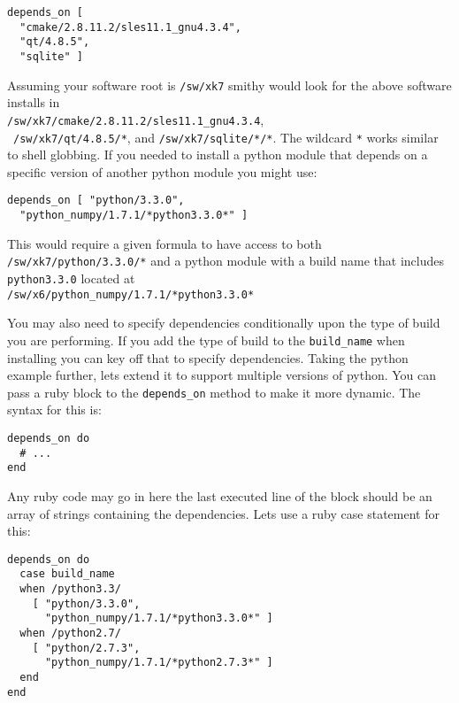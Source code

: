 \documentclass{acm_proc_article-sp}
\begin{document}
\begin{quoting}
\begin{verbatim}
depends_on [
  "cmake/2.8.11.2/sles11.1_gnu4.3.4",
  "qt/4.8.5",
  "sqlite" ]
\end{verbatim}
\end{quoting}

Assuming your software root is \texttt{/sw/xk7} smithy would look for the above
software installs in \\
\texttt{/sw/xk7/cmake/2.8.11.2/sles11.1\_gnu4.3.4}, \\
~\texttt{/sw/xk7/qt/4.8.5/*}, and \texttt{/sw/xk7/sqlite/*/*}. The wildcard
\texttt{*} works similar to shell globbing. If you needed to install a python
module that depends on a specific version of another python module you might
use:

\begin{quoting}
\begin{verbatim}
depends_on [ "python/3.3.0",
  "python_numpy/1.7.1/*python3.3.0*" ]
\end{verbatim}
\end{quoting}

This would require a given formula to have access to both
\texttt{/sw/xk7/python/3.3.0/*} and a python module with a build name that includes
\texttt{python3.3.0} located at \\
\texttt{/sw/x6/python\_numpy/1.7.1/*python3.3.0*}

You may also need to specify dependencies conditionally upon the type of build
you are performing. If you add the type of build to the \texttt{build\_name}
when installing you can key off that to specify dependencies. Taking the python
example further, lets extend it to support multiple versions of python. You can
pass a ruby block to the \texttt{depends\_on} method to make it more dynamic.
The syntax for this is:

\begin{quoting}
\begin{verbatim}
depends_on do
  # ...
end
\end{verbatim}
\end{quoting}

Any ruby code may go in here the last executed line of the block should be an
array of strings containing the dependencies. Lets use a ruby case statement
for this:

\begin{quoting}
\begin{verbatim}
depends_on do
  case build_name
  when /python3.3/
    [ "python/3.3.0",
      "python_numpy/1.7.1/*python3.3.0*" ]
  when /python2.7/
    [ "python/2.7.3",
      "python_numpy/1.7.1/*python2.7.3*" ]
  end
end
\end{verbatim}
\end{quoting}
\end{document}
